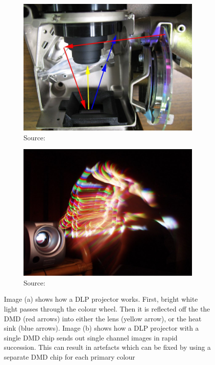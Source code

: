 \begin{figure}[ht]
    \centering
    \begin{subfigure}[b]{0.49\textwidth}
        \centering
        \includegraphics[width=\textwidth]{images/02-projector_dlp.jpg}
        \caption{Source: \citet{ImageProjectorDLP}}
    \end{subfigure}
    \hfill
    \begin{subfigure}[b]{0.49\textwidth}
        \centering
        \includegraphics[width=\textwidth]{images/02-projector_rainbow.JPG}
        \caption{Source: \citet{ImageProjectorDLPRainbow}}
    \end{subfigure}
    \caption{Image (a) shows how a DLP projector works. First, bright white light passes through the colour wheel. Then it is reflected off the the DMD (red arrows) into either the lens (yellow arrow), or the heat sink (blue arrows). Image (b) shows how a DLP projector with a single DMD chip sends out single channel images in rapid succession. This can result in artefacts which can be fixed by using a separate DMD chip for each primary colour}
    \label{fig:background_projector_dlp}
\end{figure}


